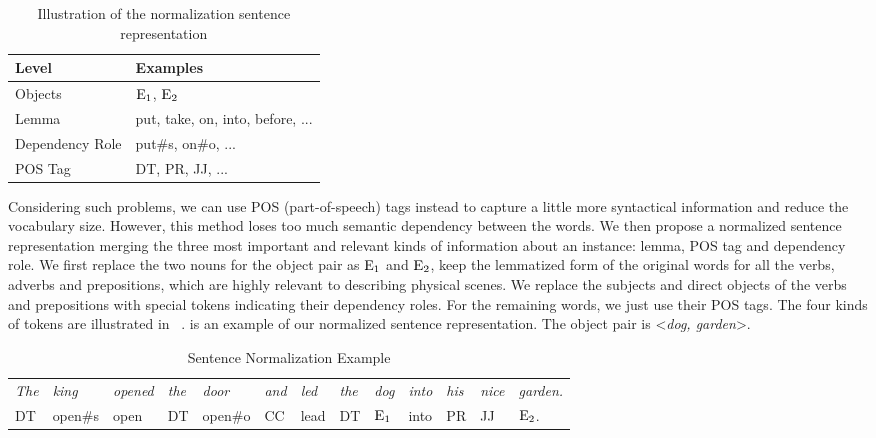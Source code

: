 \begin{table}[th]
	\centering
	\begin{tabular}{l|l}
		\hline
		\textbf{Level}	&  \textbf{Examples}\\ 		\hline
		Objects	& $\textnormal{E}_1$, $\textnormal{E}_2$ \\ 		\hline
		Lemma & put, take, on, into, before, ...\\ 		\hline 
		Dependency Role	& put\#s, on\#o, ... \\ 		\hline 
		POS Tag	& DT, PR, JJ, ... \\ 		\hline 
	\end{tabular}
	\caption{Illustration of the normalization sentence representation }
	\label{tab:norm}
\end{table}

Considering such problems, we can use POS (part-of-speech) tags instead to capture a little more syntactical information and reduce the vocabulary size. 
However, this method loses too much semantic dependency between the words. 
We then propose a normalized sentence representation merging the three most important and relevant kinds of information about an instance: lemma, POS tag and dependency role. 
We first replace the two nouns for the object pair as $\textnormal{E}_1$ and $\textnormal{E}_2$, keep the lemmatized form of the original words for all the verbs, adverbs and prepositions, which are highly relevant to describing physical scenes. 
We replace the subjects and direct objects of the verbs and prepositions with special tokens indicating their dependency roles. 
For the remaining words, we just use their POS tags. 
The four kinds of tokens are illustrated in ~.
 is an example of our normalized sentence representation. The object pair is \textless \textit{dog, garden}\textgreater.

\begin{table*}[!th]
\centering
\begin{tabular}{lllllllllllll}
		\hline
\textit{The }&\textit{king }&\textit{opened }&\textit{the}&\textit{door}&\textit{and}& \textit{led}& \textit{the}& \textit{dog }& \textit{into }& \textit{his }& \textit{nice }& \textit{garden.}\\		 
DT & open\#s & open & DT & open\#o & CC& lead& DT &$\textnormal{E}_1$ & into & PR & JJ& $\textnormal{E}_2$.\\	 \hline
\end{tabular}
\caption{Sentence Normalization Example}
\label{tab:norm_eg}
\end{table*}

